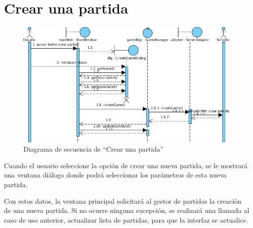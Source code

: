 \section{Crear una partida}

\begin{figure}[ht]
\centering
\includegraphics[scale=0.6]{img/ch03devel-creategame.png}
\caption{Diagrama de secuencia de ``Crear una partida''}
\end{figure}

Cuando el usuario seleccione la opción de crear una nueva partida, se le
mostrará una ventana diálogo donde podrá seleccionar los parámetros de esta
nueva partida.

Con estos datos, la ventana principal solicitará al gestor de partidas la
creación de una nueva partida. Si no ocurre ninguna excepción, se realizará una
llamada al caso de uso anterior, actualizar lista de partidas, para que la
interfaz se actualice.
